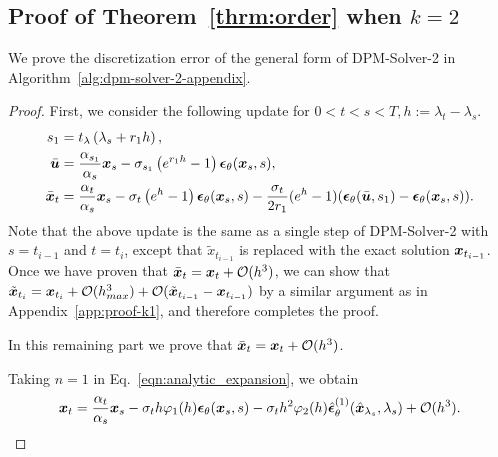 \subsection{Proof of Theorem~\ref{thrm:order} when $k=2$}
\label{appendix:proof_2nd}
We prove the discretization error of the general form of DPM-Solver-2 in Algorithm~\ref{alg:dpm-solver-2-appendix}.
\begin{proof}
First, we consider the following update for $0 < t < s < T, h := \lambda_t - \lambda_s$.
\begin{subequations}
\begin{align}
    s_{1} &= t_{\lambda}\left(\lambda_s + r_1 h\right), \\
    \bar {\bm{u}} &= \frac{\alpha_{s_1}}{\alpha_{s}} \bm{x}_{s} - \sigma_{s_1}\left(e^{r_1h} - 1\right)\bm{\epsilon}_\theta(\bm{x}_s, s), \\
    \bar {\bm{x}}_{t} &= \frac{\alpha_{t}}{\alpha_{s}} \bm{x}_s - \sigma_{t}\left(e^{h} - 1\right)\bm{\epsilon}_\theta(\bm{x}_s,s)
    - \frac{\sigma_t}{2r_1} (e^{h} - 1) (\bm{\epsilon}_\theta(\bar {\bm{u}}, s_1) - \bm{\epsilon}_\theta(\bm{x}_s, s)).
\end{align}
\end{subequations}
Note that the above update is the same as a single step of DPM-Solver-2 with $s = t_{i-1}$ and $t = t_i$, except that $\tilde x_{t_{i-1}}$ is replaced with the exact solution $\bm{x}_{t_{i-1}}$.
Once we have proven that $\bar {\bm{x}}_t = \bm{x}_t + \mathcal O(h^3)$, we can show that $\tilde {\bm{x}}_{t_i} = \bm{x}_{t_i} + \mathcal O(h_{max}^3) + \mathcal O(\tilde {\bm{x}}_{t_{i-1}} - \bm{x}_{t_{i-1}})$ by a similar argument as in Appendix~\ref{app:proof-k1}, and therefore completes the proof.

In this remaining part we prove that $\bar {\bm{x}}_t = \bm{x}_t + \mathcal O(h^3)$.

Taking $n = 1$ in Eq.~\eqref{eqn:analytic_expansion}, we obtain
\begin{equation}
\label{eqn:analytic_expansion_n1}
    \bm{x}_t = \frac{\alpha_t}{\alpha_s}\bm{x}_s 
    - \sigma_t h\varphi_{1}(h)\bm{\epsilon}_\theta(\bm{x}_s,s)
    - \sigma_t h^{2}\varphi_{2}(h)\hat{\bm{\epsilon}}_\theta^{(1)}(\hat{\bm{x}}_{\lambda_s},\lambda_s)
    +\mathcal O(h^{3}).
\end{equation}


\end{proof}
